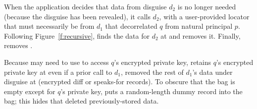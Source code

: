 %
When the application decides that data from disguise $d_2$ is no longer
needed (\eg because the disguise has been revealed), it calls
$d_2$, \fn{)} with a user-provided locator
that must necessarily be from $d_1$ that decorrelated $q$ from natural principal
$p$.
%
Following Figure~\ref{f:recursive}, \sys finds the data for $d_2$ at
 and removes it.
%
Finally, \sys removes .
%

%
Because \sys may need to use  to access $q$'s encrypted private key,
\sys retains $q$'s encrypted private key at  even if a prior call to
$d_1$, \fn{)} removed the rest of $d_1$'s data under
disguise at  (\ie encrypted diff or speaks-for records).
%
To obscure that the bag is empty except for $q$'s private key,
\sys puts a random-length dummy record into the bag; this hides that \sys
deleted previously-stored data.
%
%
%


